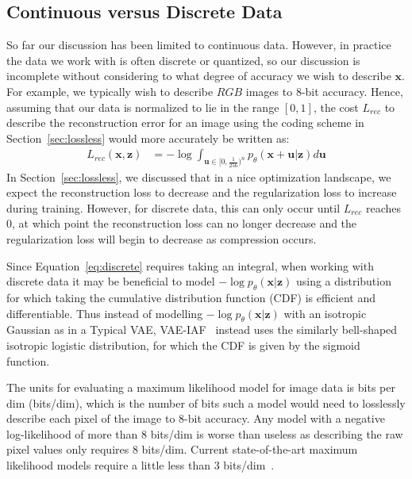\documentclass{article}
\begin{document}
\subsection{Continuous versus Discrete Data}
\label{sec:discrete}
So far our discussion has been limited to continuous data.
However, in practice the data we work with is often discrete or quantized, so our discussion is incomplete without considering to what degree of accuracy we wish to describe $\mathbf{x}$.
For example, we typically wish to describe $RGB$ images to $8$-bit accuracy.
Hence, assuming that our data is normalized to lie in the range $[0,1]$, the cost $L_{rec}$ to describe the reconstruction error for an image using the coding scheme in Section~\ref{sec:lossless} would more accurately be written as:
\begin{align}
    L_{rec}(\mathbf{x},\mathbf{z}) &= - \log \int_{\mathbf{u} \in [0,\frac{1}{256})^n} p_\theta(\mathbf{x}+\mathbf{u} | \mathbf{z}) d\mathbf{u}  \label{eq:discrete}
\end{align}
In Section~\ref{sec:lossless},  we discussed that in a nice optimization landscape, we expect the reconstruction loss to decrease and the regularization loss to increase during training.
However, for discrete data, this can only occur until $L_{rec}$ reaches $0$, at which point the reconstruction loss can no longer decrease and the regularization loss will begin to decrease as compression occurs.

Since Equation~\ref{eq:discrete} requires taking an integral,
when working with discrete data it may be beneficial to model $-\log p_\theta(\mathbf{x}|\mathbf{z})$ using a distribution for which taking the cumulative distribution function (CDF) is efficient and differentiable.
Thus instead of modelling $-\log p_\theta(\mathbf{x}|\mathbf{z})$ with an isotropic Gaussian as in a Typical VAE, VAE-IAF~\cite{kingma2016improved} instead uses the similarly bell-shaped isotropic logistic distribution, for which the CDF is given by the sigmoid function.
 
 The units for evaluating a maximum likelihood model for image data is bits per dim (bits/dim), which is the number of bits such a model would need to losslessly describe each pixel of the image to $8$-bit accuracy.
 Any model with a negative log-likelihood of more than $8$ bits/dim is worse than useless as describing the raw pixel values only requires $8$ bits/dim.
 Current state-of-the-art maximum likelihood models require a little less than $3$ bits/dim~\cite{chen2018pixelsnail}.
 
\end{document}
